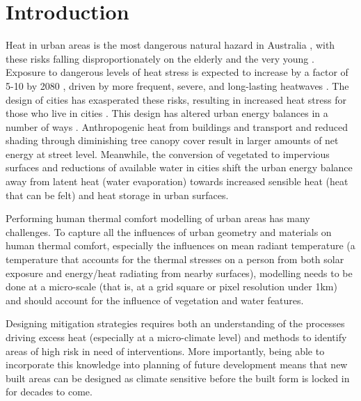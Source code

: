 \documentclass[final,3p,times,authoryear]{elsarticle}
\begin{document}
\maketitle





\section{Introduction}
Heat in urban areas is the most dangerous natural hazard in Australia \citep{Coates2014}, with these risks falling disproportionately on the elderly and the very young \citep{Nicholls2008}. Exposure to dangerous levels of heat stress is expected to increase by a factor of 5-10 by 2080 \citep{Coffel2018}, driven by more frequent, severe, and long-lasting heatwaves \citep{IPCC2013a}. The design of cities has exasperated these risks, resulting in increased heat stress for those who live in cities \citep{Coutts2012,Martilli2020}. This design has altered urban energy balances in a number of ways \citep{Oke1982}. Anthropogenic heat from buildings and transport and reduced shading through diminishing tree canopy cover result in larger amounts of net energy at street level. Meanwhile, the conversion of vegetated to impervious surfaces and reductions of available water in cities shift the urban energy balance away from latent heat (water evaporation) towards increased sensible heat (heat that can be felt) and heat storage in urban surfaces. 

Performing human thermal comfort modelling of urban areas has many challenges. To capture all the influences of urban geometry and materials on human thermal comfort, especially the influences on mean radiant temperature \citep{Kantor2011} (a temperature that accounts for the thermal stresses on a person from both solar exposure and energy/heat radiating from nearby surfaces), modelling needs to be done at a micro-scale (that is, at a grid square or pixel resolution under 1km) and should account for the influence of vegetation and water features.

Designing mitigation strategies requires both an understanding of the processes driving excess heat (especially at a micro-climate level) and methods to identify areas of high risk in need of interventions. More importantly, being able to incorporate this knowledge into planning of future development means that new built areas can be designed as climate sensitive before the built form is locked in for decades to come. 
\end{document}
